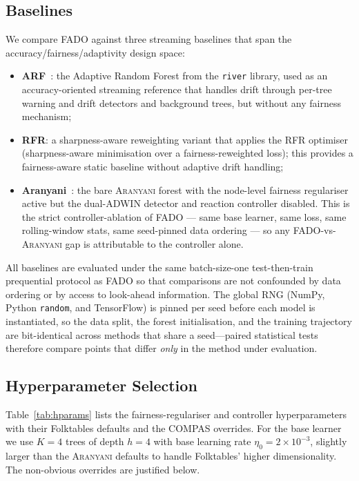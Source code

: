 \documentclass[sigconf,anonymous,review]{acmart}
\begin{document}
\subsection{Baselines}
\label{sec:method:baselines}
We compare \textsc{FADO} against three streaming baselines that span the accuracy/fairness/adaptivity design space:
\begin{itemize}
  \item \textbf{ARF}~\cite{10.1007/s10994-017-5642-8}: the Adaptive Random Forest from the \texttt{river} library, used as an accuracy-oriented streaming reference that handles drift through per-tree warning and drift detectors and background trees, but without any fairness mechanism;
  \item \textbf{RFR}: a sharpness-aware reweighting variant that applies the RFR optimiser~\cite{jiang2023chasingfairnessdistributionshift} (sharpness-aware minimisation over a fairness-reweighted loss); this provides a fairness-aware static baseline without adaptive drift handling;
  \item \textbf{Aranyani}~\cite{chowdhury2024enhancing}: the bare \textsc{Aranyani} forest with the node-level fairness regulariser active but the dual-ADWIN detector and reaction controller disabled. This is the strict controller-ablation of \textsc{FADO} --- same base learner, same loss, same rolling-window stats, same seed-pinned data ordering --- so any \textsc{FADO}-vs-\textsc{Aranyani} gap is attributable to the controller alone.
\end{itemize}
All baselines are evaluated under the same batch-size-one test-then-train prequential protocol as \textsc{FADO} so that comparisons are not confounded by data ordering or by access to look-ahead information. The global RNG (NumPy, Python \texttt{random}, and TensorFlow) is pinned per seed before each model is instantiated, so the data split, the forest initialisation, and the training trajectory are bit-identical across methods that share a seed---paired statistical tests therefore compare points that differ \emph{only} in the method under evaluation.

\subsection{Hyperparameter Selection}
\label{sec:method:hpo}
Table~\ref{tab:hparams} lists the fairness-regulariser and controller hyperparameters with their Folktables defaults and the COMPAS overrides. For the base learner we use $K=4$ trees of depth $h=4$ with base learning rate $\eta_0=2{\times}10^{-3}$, slightly larger than the \textsc{Aranyani} defaults to handle Folktables' higher dimensionality. The non-obvious overrides are justified below.
\end{document}
